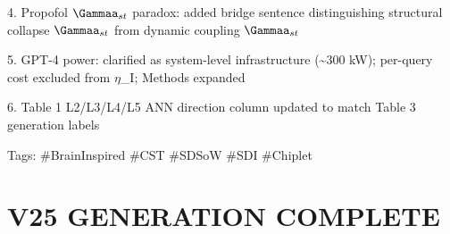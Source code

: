 \documentclass[a4paper,12pt]{article}
\begin{document}
4. Propofol $\Gammaa_{st}$ paradox: added bridge sentence distinguishing structural collapse $\Gammaa_{st}$ from dynamic coupling $\Gammaa_{st}$

5. GPT-4 power: clarified as system-level infrastructure (\textasciitilde{}300 kW); per-query cost excluded from $\eta$\_I; Methods expanded

6. Table 1 L2/L3/L4/L5 ANN direction column updated to match Table 3 generation labels

Tags: \#BrainInspired \#CST \#SDSoW \#SDI \#Chiplet

\section*{V25 GENERATION COMPLETE}
\end{document}
